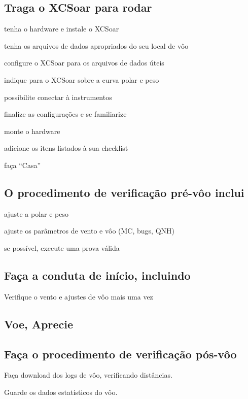 \documentclass[a4paper,12pt,utf8]{scrreprt}
\begin{document}
\subsection{\textcolor{flashblue}{Traga o XCSoar para rodar}}
\begin{compactitem}
\item tenha o hardware e instale o XCSoar
\item tenha os arquivos de dados apropriados do seu local de vôo
\item configure o XCSoar para os arquivos de dados úteis
\item indique para o XCSoar sobre a curva polar e peso
\item possibilite conectar à instrumentos
\item finalize as configurações e se familiarize
\item monte o hardware
\item adicione os itens listados à sua checklist
\item faça ``Casa''
\end{compactitem}

\subsection*{\textcolor{flashblue}{O procedimento de verificação pré-vôo inclui}}
\begin{compactitem}
\item ajuste a polar e peso
\item ajuste os parâmetros de vento e vôo (MC, bugs,  QNH)
\item se possível, execute uma prova válida
\end{compactitem}

\subsection*{\textcolor{flashblue}{Faça a conduta de início, incluindo}}
\begin{compactitem}
\item Verifique o vento e ajustes de vôo mais uma vez
\end{compactitem}

\subsection*{\textcolor{flashblue}{Voe, Aprecie}}

\subsection*{\textcolor{flashblue}{Faça o procedimento de verificação pós-vôo}}
\begin{compactitem}
\item Faça download dos logs de vôo, verificando distâncias.
\item Guarde os dados estatísticos do vôo.
\end{compactitem}
\end{document}
